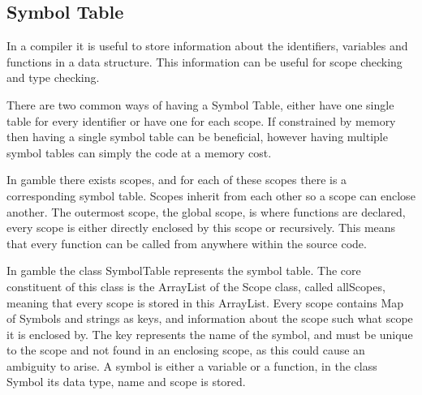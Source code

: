 \subsection*{Symbol Table}
In a compiler it is useful to store information about the identifiers, variables and functions in a data structure. 
This information can be useful for scope checking and type checking.

There are two common ways of having a Symbol Table, either have one single table for every identifier or have one for each scope. 
If constrained by memory then having a single symbol table can be beneficial, however having multiple symbol tables can simply the code at a memory cost. 

In \gls{gamble} there exists scopes, and for each of these scopes there is a corresponding symbol table. 
Scopes inherit from each other so a scope can enclose another. 
The outermost scope, the global scope, is where functions are declared, every scope is either directly enclosed by this scope or recursively.
This means that every function can be called from anywhere within the source code. 

In \gls{gamble} the class SymbolTable represents the symbol table.
The core constituent of this class is the ArrayList of the Scope class, called allScopes, meaning that every scope is stored in this ArrayList.
Every scope contains Map of Symbols and strings as keys, and information about the scope such what scope it is enclosed by. 
The key represents the name of the symbol, and must be unique to the scope and not found in an enclosing scope, as this could cause an ambiguity to arise. 
A symbol is either a variable or a function, in the class Symbol its data type, name and scope is stored. 
